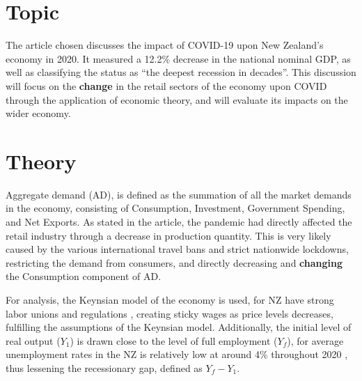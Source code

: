 \documentclass[a4paper,12pt]{article}
\begin{document}


\section*{Topic}
The article chosen discusses the impact of COVID-19 upon New Zealand's economy in 2020. It  measured a 12.2\% decrease in the national nominal GDP, as well as classifying the status as ``the deepest recession in decades''. This discussion will focus on the \textbf{change} in the retail sectors of the economy upon COVID through the application of economic theory, and will evaluate its impacts on the wider economy.

\section*{Theory}
Aggregate demand (AD), is defined as the summation of all the market demands in the economy, consisting of Consumption, Investment, Government Spending, and Net Exports. As stated in the article, the pandemic had directly affected the retail industry through a decrease in production quantity. This is very likely caused by the various international travel bans and strict nationwide lockdowns, restricting the demand from consumers, and directly decreasing and \textbf{changing} the Consumption component of AD.

For analysis, the Keynsian model of the economy is used, for NZ have strong labor unions and regulations \parencite{labor}, creating sticky wages as price levels decreases, fulfilling the assumptions of the Keynsian model. Additionally, the initial level of real output ($Y_1$) is drawn close to the level of full employment ($Y_f$), for average unemployment rates in the NZ is relatively low at around 4\% throughout 2020 \parencite{unemploy}, thus lessening the recessionary gap, defined as $Y_f-Y_1$.
\end{document}
